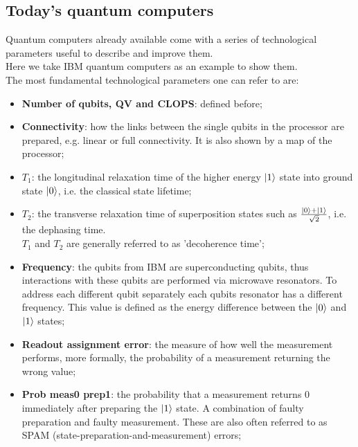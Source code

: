 \subsection{Today's quantum computers}
Quantum computers already available come with a series of technological parameters useful to describe and improve them. \\
Here we take IBM quantum computers \cite{BibEntry2022Sep} as an example to show them. \\
The most fundamental technological parameters one can refer to are:
\begin{itemize}
    \item \textbf{Number of qubits, QV and CLOPS}: defined before;
    
    \item \textbf{Connectivity}: how the links between the single qubits in the processor are prepared, e.g. linear or full connectivity. It is also shown by a map of the processor;
    
    \item $T_1$: the longitudinal relaxation time of the higher energy $\ket{1}$ state into ground state $\ket{0}$, i.e. the classical state lifetime;
    
    \item $T_2$: the transverse relaxation time of superposition states such as $\frac{\ket{0} + \ket{1}}{\sqrt{2}}$, i.e. the dephasing time. \\
    $T_1$ and $T_2$ are generally referred to as 'decoherence time';
    
    \item \textbf{Frequency}: the qubits from IBM are superconducting qubits, thus interactions with these qubits are performed via microwave resonators. To address each different qubit separately each qubits resonator has a different frequency. This value is defined as the energy difference between the $\ket{0}$ and $\ket{1}$ states;
    
    \item \textbf{Readout assignment error}: the measure of how well the measurement performs, more formally, the probability of a measurement returning the wrong value;
    
    \item \textbf{Prob meas0 prep1}: the probability that a measurement returns $0$ immediately after preparing the $\ket{1}$ state. A combination of faulty preparation and faulty measurement. These are also often referred to as SPAM (state-preparation-and-measurement) errors;
    

\end{itemize}
